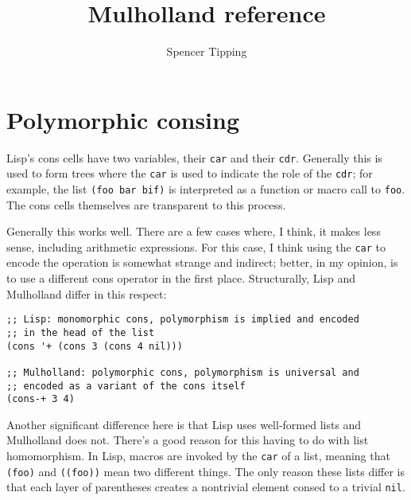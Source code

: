\documentclass{report}
\title{Mulholland reference}
\author{Spencer Tipping}
\begin{document}
\maketitle{}
\tableofcontents{}

\chapter{Polymorphic consing}
  Lisp's cons cells have two variables, their {\tt car} and their {\tt cdr}. Generally this is used to form trees where the {\tt car} is used to indicate the role of the {\tt cdr}; for
  example, the list {\tt (foo bar bif)} is interpreted as a function or macro call to {\tt foo}. The cons cells themselves are transparent to this process.

  Generally this works well. There are a few cases where, I think, it makes less sense, including arithmetic expressions. For this case, I think using the {\tt car} to encode the operation is
  somewhat strange and indirect; better, in my opinion, is to use a different cons operator in the first place. Structurally, Lisp and Mulholland differ in this respect:

\begin{verbatim}
;; Lisp: monomorphic cons, polymorphism is implied and encoded
;; in the head of the list
(cons '+ (cons 3 (cons 4 nil)))

;; Mulholland: polymorphic cons, polymorphism is universal and
;; encoded as a variant of the cons itself
(cons-+ 3 4)
\end{verbatim}

  Another significant difference here is that Lisp uses well-formed lists and Mulholland does not. There's a good reason for this having to do with list homomorphism. In Lisp, macros are
  invoked by the {\tt car} of a list, meaning that {\tt (foo)} and {\tt ((foo))} mean two different things. The only reason these lists differ is that each layer of parentheses creates a
  nontrivial element consed to a trivial {\tt nil}.
\end{document}
